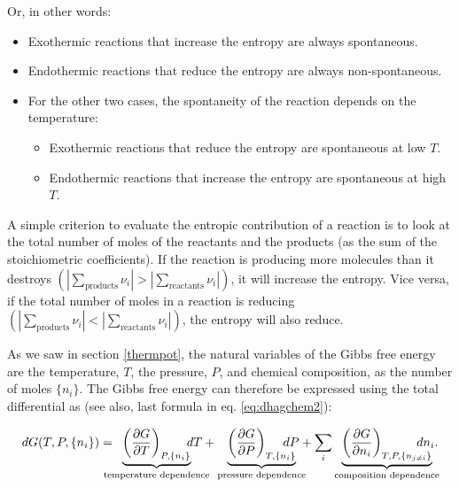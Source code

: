 \documentclass[
  9pt,
]{extbook}
\providecommand{\tightlist}{%
  \setlength{\itemsep}{0pt}\setlength{\parskip}{0pt}}
\theoremstyle{definition}
\theoremstyle{definition}
\theoremstyle{definition}
\theoremstyle{remark}
\begin{document}
Or, in other words:

\begin{itemize}
\tightlist
\item
  Exothermic reactions that increase the entropy are always spontaneous.
\item
  Endothermic reactions that reduce the entropy are always non-spontaneous.
\item
  For the other two cases, the spontaneity of the reaction depends on the temperature:

  \begin{itemize}
  \tightlist
  \item
    Exothermic reactions that reduce the entropy are spontaneous at low \(T\).
  \item
    Endothermic reactions that increase the entropy are spontaneous at high \(T\).
  \end{itemize}
\end{itemize}

A simple criterion to evaluate the entropic contribution of a reaction is to look at the total number of moles of the reactants and the products (as the sum of the stoichiometric coefficients). If the reaction is producing more molecules than it destroys \(\left( \left| \sum_\text{products} \nu_i \right| > \left| \sum_\text{reactants} \nu_i \right| \right)\), it will increase the entropy. Vice versa, if the total number of moles in a reaction is reducing \(\left( \left| \sum_\text{products} \nu_i \right| < \left| \sum_\text{reactants} \nu_i \right| \right)\), the entropy will also reduce.

As we saw in section \ref{thermpot}, the natural variables of the Gibbs free energy are the temperature, \(T\), the pressure, \(P\), and chemical composition, as the number of moles \(\{n_i\}\). The Gibbs free energy can therefore be expressed using the total differential as (see also, last formula in eq. \eqref{eq:dhagchem2}):

\begin{equation}
dG(T,P,\{n_i\}) = \mkern-18mu \underbrace{\left(\frac{\partial G}{\partial T} \right)_{P,\{n_i\}}}_{\text{temperature dependence}} \mkern-36mu dT + \underbrace{\left(\frac{\partial G}{\partial P} \right)_{T,\{n_i\}}}_{\text{pressure dependence}} \mkern-36mu dP + \sum_i \underbrace{\left(\frac{\partial G}{\partial n_i} \right)_{T,P,\{n_{j \neq i}\}}}_{\text{composition dependence}} \mkern-36mu dn_i.
\label{eq:dgtotdiff}
\end{equation}
\end{document}
